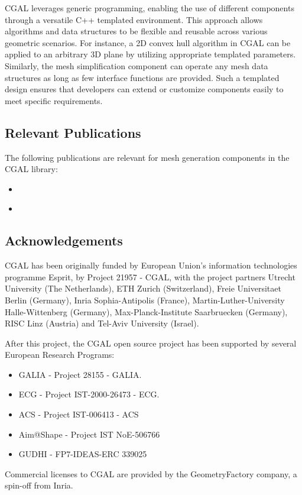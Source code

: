 CGAL leverages generic programming, enabling the use of different components through a versatile C++ templated environment. 
This approach allows algorithms and data structures to be flexible and reusable across various geometric scenarios. 
For instance, a 2D convex hull algorithm in CGAL can be applied to an arbitrary 3D plane by utilizing appropriate templated parameters. Similarly, the mesh simplification component can operate any mesh data structures as long as few interface functions are provided. 
Such a templated design ensures that developers can extend or customize components easily to meet specific requirements.


\subsection{Relevant Publications}
\label{sec:CGAL:publications}

The following publications are relevant for mesh generation components in the CGAL library:


\begin{itemize}
\item \cite{jamin_cgalmesh_2015}
\item \cite{portaneri_alpha_2022}
\end{itemize}


\subsection{Acknowledgements}
\label{sec::CGAL:acknowledgements}

%
%



CGAL has been originally funded by European Union's information technologies programme Esprit, by Project 21957 - CGAL, with the project partners Utrecht University (The Netherlands), ETH Zurich (Switzerland), Freie Universitaet Berlin (Germany), Inria Sophia-Antipolis (France), Martin-Luther-University Halle-Wittenberg (Germany), Max-Planck-Institute Saarbruecken (Germany), RISC Linz (Austria) and Tel-Aviv University (Israel).

After this project, the CGAL open source project has been supported by several European Research Programs:
\begin{itemize}
\item GALIA - Project 28155 - GALIA.
\item ECG -  Project IST-2000-26473 - ECG.
\item ACS - Project IST-006413 - ACS
\item Aim@Shape - Project IST NoE-506766
\item GUDHI - FP7-IDEAS-ERC 339025
\end{itemize}

Commercial licenses to CGAL are provided by the GeometryFactory company, a spin-off from Inria.



